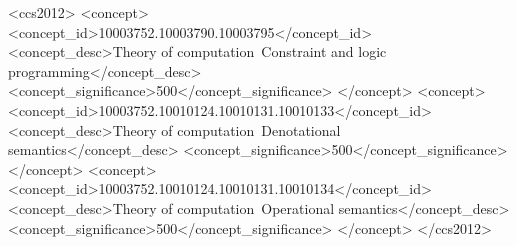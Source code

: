 \documentclass[sigplan,10pt,anonymous,review]{acmart}
\begin{document}
\begin{CCSXML}
<ccs2012>
<concept>
<concept_id>10003752.10003790.10003795</concept_id>
<concept_desc>Theory of computation~Constraint and logic programming</concept_desc>
<concept_significance>500</concept_significance>
</concept>
<concept>
<concept_id>10003752.10010124.10010131.10010133</concept_id>
<concept_desc>Theory of computation~Denotational semantics</concept_desc>
<concept_significance>500</concept_significance>
</concept>
<concept>
<concept_id>10003752.10010124.10010131.10010134</concept_id>
<concept_desc>Theory of computation~Operational semantics</concept_desc>
<concept_significance>500</concept_significance>
</concept>
</ccs2012>
\end{CCSXML}




\maketitle
\thispagestyle{empty}

















\end{document}
